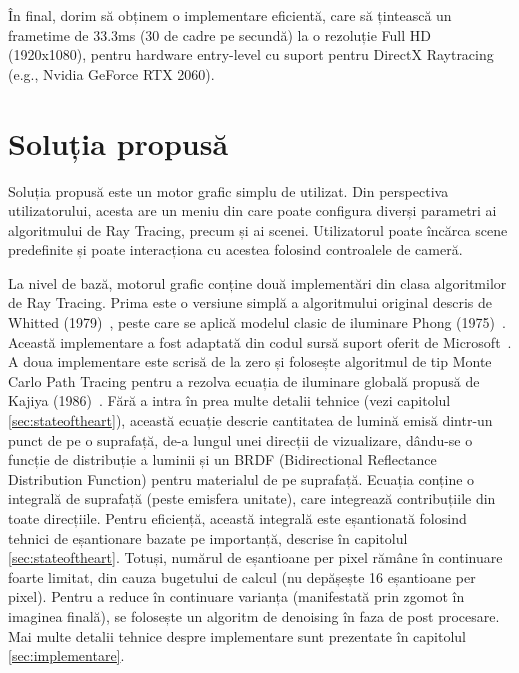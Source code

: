 \documentclass[12pt,a4paper]{report}
\numberwithin{equation}{section} %
\begin{document}
În final, dorim să obținem o implementare eficientă, care să țintească un frametime de 33.3ms
(30 de cadre pe secundă) la o rezoluție Full HD (1920x1080), pentru hardware entry-level cu suport pentru
DirectX Raytracing (e.g., Nvidia GeForce RTX 2060).

\subsubsection*{}

\section{Soluția propusă}
Soluția propusă este un motor grafic simplu de utilizat. Din perspectiva utilizatorului,
acesta are un meniu din care poate configura diverși parametri ai algoritmului
de Ray Tracing, precum și ai scenei. Utilizatorul poate încărca scene predefinite
și poate interacționa cu acestea folosind controalele de cameră.

La nivel de bază, motorul grafic conține două implementări din clasa algoritmilor
de Ray Tracing. Prima este o versiune simplă a algoritmului original descris de
Whitted (1979)~\cite{Whitted}, peste care se aplică modelul clasic de iluminare
Phong (1975)~\cite{Phong}. Această implementare a fost adaptată din codul sursă
suport oferit de Microsoft~\cite{Schelet}.
A doua implementare este scrisă de la zero și folosește algoritmul de tip Monte Carlo
Path Tracing pentru a rezolva ecuația de iluminare globală propusă de Kajiya (1986)~\cite{Kajiya}.
Fără a intra în prea multe detalii tehnice (vezi capitolul \ref{sec:stateoftheart}),
această ecuație descrie cantitatea de lumină emisă dintr-un punct de pe o suprafață,
de-a lungul unei direcții de vizualizare, dându-se o funcție de distribuție a luminii
și un BRDF (Bidirectional Reflectance Distribution Function) pentru materialul de pe
suprafață. Ecuația conține o integrală de suprafață (peste emisfera unitate), care
integrează contribuțiile din toate direcțiile. Pentru eficiență, această integrală
este eșantionată folosind tehnici de eșantionare bazate pe importanță, descrise în capitolul \ref{sec:stateoftheart}.
Totuși, numărul de eșantioane per pixel rămâne în continuare foarte limitat, din
cauza bugetului de calcul (nu depășește 16 eșantioane per pixel). Pentru a reduce
în continuare varianța (manifestată prin zgomot în imaginea finală), se folosește
un algoritm de denoising în faza de post procesare. Mai multe detalii tehnice
despre implementare sunt prezentate în capitolul \ref{sec:implementare}.
\end{document}

